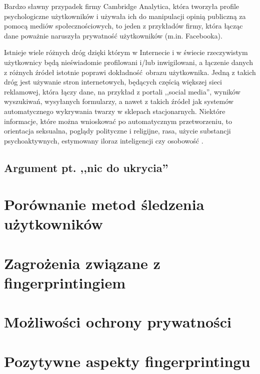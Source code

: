 Bardzo sławny przypadek firmy Cambridge Analytica, która tworzyła profile
psychologiczne użytkowników i używała ich do manipulacji opinią publiczną za
pomocą mediów społecznościowych, to jeden z przykładów firmy, która łącząc dane
poważnie naruszyła prywatność użytkowników (m.in. Facebooka).

Istnieje wiele różnych dróg dzięki którym w Internecie i w świecie rzeczywistym
użytkownicy będą nieświadomie profilowani i/lub inwigilowani, a łączenie danych
z różnych źródeł istotnie poprawi dokładność obrazu użytkownika. Jedną z takich
dróg jest używanie stron internetowych, będących częścią większej sieci
reklamowej, która łączy dane, na przykład z portali ,,social media'', wyników
wyszukiwań, wysyłanych formularzy, a nawet z takich źródeł jak systemów
automatycznego wykrywania twarzy w sklepach stacjonarnych. Niektóre informacje,
które można wnioskować po automatycznym przetworzeniu, to orientacja seksualna,
poglądy polityczne i religijne, rasa, użycie substancji psychoaktywnych,
estymowany iloraz inteligencji czy osobowość \cite{kosinski2013private}.

\subsection{Argument pt. ,,nic do ukrycia''}

\section{Porównanie metod śledzenia użytkowników}

\section{Zagrożenia związane z fingerprintingiem}

\section{Możliwości ochrony prywatności}

\section{Pozytywne aspekty fingerprintingu}
